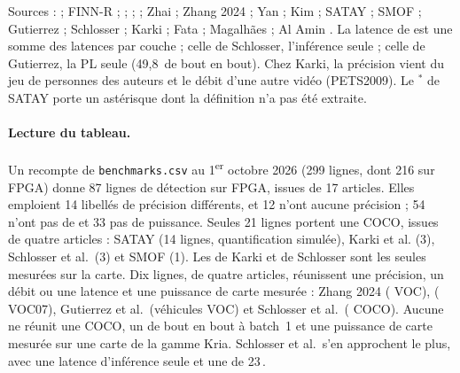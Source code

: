 Sources :  \citep[Tables~1--2]{2019-ding-req-yolo-resource-aware-efficient} ; FINN-R
\citep[Table~5]{arxiv-1809.04570-finn-r-end-end-deep} ; 
\citep[§5.2.1]{2021-xu-dac-sdc-low-power-object} ; 
\citep[Tables~6--7]{arxiv-1909.09709-skynet-hardware-efficient-method-object}\pp{} ; 
\citep[Tables~3, 5, 6]{arxiv-2006.08357-codenet-efficient-deployment-input-adaptive} ; Zhai
\citep[Tables~8--9]{2023-zhai-fpga-vehicle-detection-tracking-accelerator} ; Zhang 2024
\citep[Tables~4--5]{2024-zhang-end-end-acceleration-yolo-object} ; Yan
\citep[Tables~2--3]{2024-yan-fpga-yolov5-accelerator-real-time} ; Kim
\citep[Tables~8--9]{2025-kim-design-implementation-yolov2-accelerator-zynq} ; SATAY
\citep[Tables~III--IV]{2023-montgomerie-corcoran-satay-streaming-architecture-toolflow-accelerating} ;
SMOF \citep[Tables~III, V]{arxiv-2403.18921-smof-streaming-modern-cnns-fpgas}\pp{} ;
Gutierrez \citep[§V-D, Table~II]{arxiv-2609.24757-npu-accelerator-quantized-real-time}\pp{} ;
Schlosser \citep[Table~1]{arxiv-2304.11580-framework-benchmarking-real-time-embedded} ;
Karki \citep[Tables~II--III, §IV-C]{arxiv-2607.13106-no-attention-no-problem-dpu}\pp{} ;
Fata \citep[Tables~7--8]{2026-fata-low-cost-fpga-enhanced-cnn} ;
Magalhães \citep[§3]{arxiv-2211.11647-benchmarking-edge-computing-devices-grape} ; Al Amin
\citep[Table~I]{arxiv-2507.18174-real-time-object-detection-classification}. La latence de
 est une somme des latences par couche ; celle de Schlosser, l'inférence seule ;
celle de Gutierrez, la PL seule (49,8\, de bout en bout). Chez Karki, la précision vient du jeu de personnes des auteurs et le débit d'une
autre vidéo (PETS2009). Le $^{*}$ de SATAY porte un astérisque dont la définition n'a
pas été extraite.

\paragraph{Lecture du tableau.} Un recompte de \texttt{benchmarks.csv} au 1\textsuperscript{er}
octobre 2026 (299 lignes, dont 216 sur FPGA) donne 87 lignes de détection sur FPGA, issues de
17 articles. Elles emploient 14 libellés de précision différents, et 12 n'ont aucune
précision ; 54 n'ont pas de  et 33 pas de puissance. Seules 21 lignes portent une 
COCO, issues de quatre articles : SATAY (14 lignes, quantification simulée), Karki et al.
(3), Schlosser et al.\ (3) et SMOF (1). Les  de Karki et de Schlosser sont les seules
mesurées sur la carte. Dix lignes, de quatre articles, réunissent une précision, un débit
ou une latence et une puissance de carte mesurée : Zhang 2024 ( VOC),  (
VOC07), Gutierrez et al.\ (véhicules VOC) et Schlosser et al.\ ( COCO). Aucune ne réunit
une  COCO, un  de bout en bout à batch~1 et une puissance de carte mesurée sur une
carte de la gamme Kria. Schlosser et al.\ s'en approchent le plus, avec une latence
d'inférence seule et une  de 23\,.

